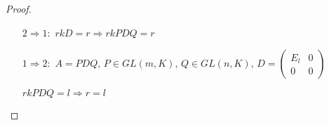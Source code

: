 \begin{proof}
    \
    \begin{itemize}
        \item[$2 \Rightarrow 1:$] $rk D = r \Longrightarrow rk PDQ = r$
        \item[$1 \Rightarrow 2:$] $A = PDQ,\, P \in GL(m, K),\, Q \in GL(n, K),\, D =
        \begin{pmatrix}
            E_l & 0\\
            0 & 0
        \end{pmatrix}$
    
            $rk PDQ = l \Longrightarrow r = l$
    \end{itemize}

\end{proof}

